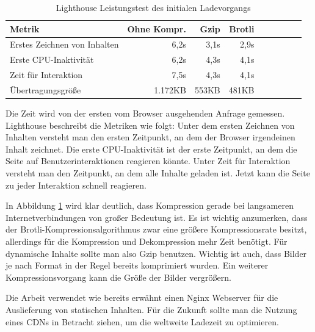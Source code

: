 \begin{table}[h]
    \begin{center}
\begin{tabular}{l*{8}{r}}
Metrik & Ohne Kompr. & Gzip & Brotli \\
\hline
Erstes Zeichnen von Inhalten & 6,2s  & 3,1s & 2,9s \\
Erste CPU-Inaktivität        & 6,2s  & 4,3s & 4,1s \\
Zeit für Interaktion         & 7,5s  & 4,3s & 4,1s \\
Übertragungsgröße            & 1.172KB  &  553KB & 481KB \\
\end{tabular}
\end{center}
\caption{Lighthouse Leistungstest des initialen Ladevorgangs}
\label{tab:lighthouseleistungstestdesinitialenladevorgangs}
\end{table}

Die Zeit wird von der ersten vom Browser ausgehenden Anfrage gemessen.
Lighthouse beschreibt die Metriken wie folgt: Unter dem ersten Zeichnen
von Inhalten versteht man den ersten Zeitpunkt, an dem der Browser
irgendeinen Inhalt zeichnet. Die erste CPU-Inaktivität ist
der erste Zeitpunkt, an dem die Seite auf Benutzerinteraktionen reagieren könnte.
Unter Zeit für Interaktion versteht man den Zeitpunkt, an dem alle Inhalte geladen ist.
Jetzt kann die Seite zu jeder Interaktion schnell reagieren.\cite{WhatPerformanceMetricsMeasure}

In Abbildung \ref{tab:lighthouseleistungstestdesinitialenladevorgangs} wird klar deutlich,
dass Kompression gerade bei langsameren Internetverbindungen von großer Bedeutung ist.
Es ist wichtig anzumerken, dass der Brotli-Kompressionsalgorithmus zwar eine größere
Kompressionsrate besitzt, allerdings für die Kompression und Dekompression mehr Zeit
benötigt.\cite{CompressionBenchmark} Für dynamische Inhalte sollte man also Gzip
benutzen. Wichtig ist auch, dass Bilder je nach Format in der Regel bereits komprimiert wurden.
Ein weiterer Kompressionsvorgang kann die Größe der Bilder vergrößern.

Die Arbeit verwendet wie bereits erwähnt einen Nginx Webserver für die
Auslieferung von statischen Inhalten. Für die Zukunft sollte man die Nutzung
eines CDNs in Betracht ziehen, um die weltweite Ladezeit zu optimieren.

